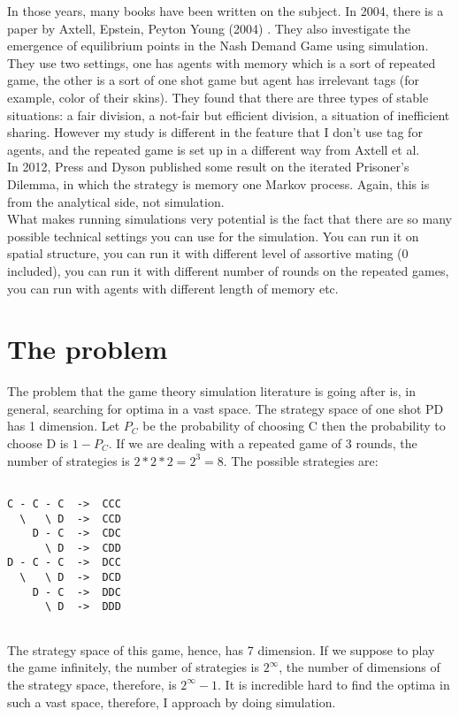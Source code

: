 \documentclass[12.5pt]{report}
\begin{document}
In those years, many books have been written on the subject. In 2004, there is a paper by Axtell, Epstein, Peyton Young (2004) \cite{axtell}. They also investigate the emergence of equilibrium points in the Nash Demand Game using simulation. They use two settings, one has agents with memory which is a sort of repeated game, the other is a sort of one shot game but agent has irrelevant tags (for example, color of their skins). They found that there are three types of stable situations: a fair division, a not-fair but efficient division, a situation of inefficient sharing. However my study is different in the feature that I don't use tag for agents, and the repeated game is set up in a different way from Axtell et al.\\

In 2012, Press and Dyson published some result on the iterated Prisoner's Dilemma, in which the strategy is memory one Markov process. Again, this is from the analytical side, not simulation.\\

What makes running simulations very potential is the fact that there are so many possible technical settings you can use for the simulation. You can run it on spatial structure, you can run it with different level of assortive mating (0 included), you can run it with different number of rounds on the repeated games, you can run with agents with different length of memory etc.


\chapter{The problem}
The problem that the game theory simulation literature is going after is, in general, searching for optima in a vast space. The strategy space of one shot PD has 1 dimension. Let $P_{C}$ be the probability of choosing C then the probability to choose D is $1 - P_C$. If we are dealing with a repeated game of 3 rounds, the number of strategies is $2*2*2 = 2^3 = 8$. The possible strategies are:

\begin{verbatim}

C - C - C  ->  CCC
  \   \ D  ->  CCD
    D - C  ->  CDC
      \ D  ->  CDD
D - C - C  ->  DCC
  \   \ D  ->  DCD
    D - C  ->  DDC
      \ D  ->  DDD
      
\end{verbatim}

The strategy space of this game, hence, has 7 dimension. If we suppose to play the game infinitely, the number of strategies is $2^{\infty}$, the number of dimensions of the strategy space, therefore, is $2^{\infty} - 1$. It is incredible hard to find the optima in such a vast space, therefore, I approach by doing simulation.
\end{document}
